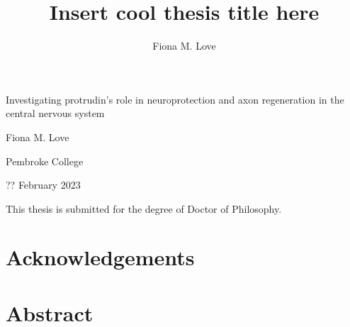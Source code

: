 \documentclass[
  12pt,
  a4paper,
]{book}
\title{Insert cool thesis title here}
\author{Fiona M. Love}
\date{}
\begin{document}
\maketitle

\begin{titlepage}
\begin{center}

  \hspace{0pt}
  \vfill
  
  {\Huge
  Investigating protrudin's role in neuroprotection and axon regeneration in the central nervous system
  }\par
  
  {\Large
  Fiona M. Love
  }\par
  
   \vspace{1\baselineskip}
  
  {Pembroke College}\par
  {?? February 2023}\par
  
  \vspace{4\baselineskip}
  
  {This thesis is submitted for the degree of Doctor of Philosophy.}\par
  
  \vfill
  \hspace{0pt}

\end{center}
\end{titlepage}

\hypertarget{ACKNOWLEDGEMENTS}{%
\chapter*{Acknowledgements}\label{ACKNOWLEDGEMENTS}}


\hypertarget{ABSTRACT}{%
\chapter*{Abstract}\label{ABSTRACT}}


\end{document}
